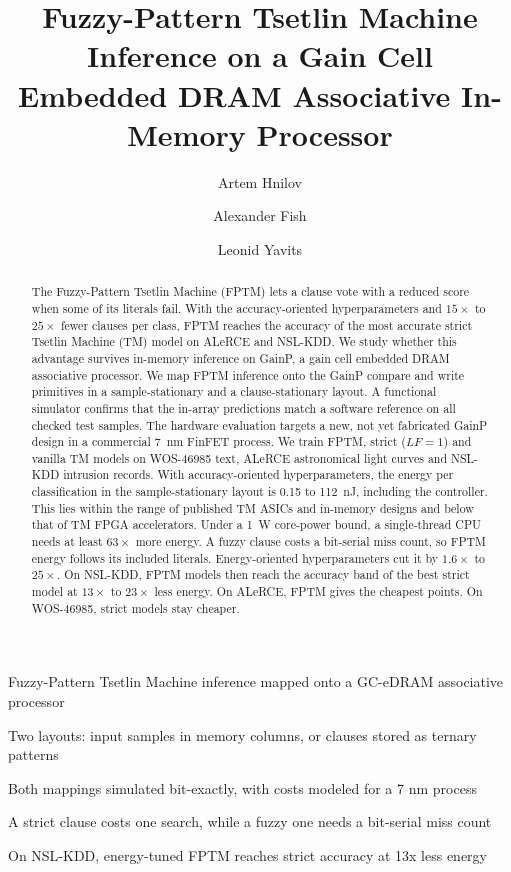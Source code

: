 \documentclass[preprint,review,12pt]{elsarticle}
\newcommand{\gainp}{GainP}
\newcommand{\hyp}[1]{#1}   %
\newcommand{\LF}{\mathit{LF}}
\newcommand{\wosnew}[1]{#1}   %
\newcommand{\artem}[1]{#1}
\begin{document}
\begin{frontmatter}

\title{Fuzzy-Pattern Tsetlin Machine Inference on a Gain Cell Embedded DRAM Associative In-Memory Processor}

\author[ind]{Artem Hnilov}
\author[biu]{Alexander Fish}
\author[biu]{Leonid Yavits}

\begin{abstract}
The Fuzzy-Pattern Tsetlin Machine (FPTM) lets a clause vote with a reduced score when some of its literals fail. \artem{With the accuracy-oriented hyperparameters and $15\times$ to $25\times$ fewer clauses per class, FPTM reaches the accuracy of the most accurate strict Tsetlin Machine (TM) model on ALeRCE and NSL-KDD.}
We study whether this advantage survives in-memory inference on \gainp{}, a gain cell embedded DRAM associative processor.
We map FPTM inference onto the \gainp{} compare and write primitives in a sample-stationary and a clause-stationary layout.
A functional simulator confirms that the in-array predictions match a software reference \wosnew{on all checked test samples}.
The hardware evaluation targets a new, not yet fabricated \gainp{} design in a commercial 7~nm FinFET process.
We train FPTM, strict ($\LF=1$) and vanilla TM models on WOS-46985 text, ALeRCE astronomical light curves and NSL-KDD intrusion records.
\wosnew{With accuracy-oriented hyperparameters,} \hyp{the energy per classification in the sample-stationary layout is 0.15 to 112~nJ, including the controller. This lies within the range of published TM ASICs and in-memory designs and below that of TM FPGA accelerators. Under a 1~W core-power bound, a single-thread CPU needs at least $63\times$ more energy.}
\wosnew{A fuzzy clause costs a bit-serial miss count, so FPTM energy follows its included literals. Energy-oriented hyperparameters cut it by $1.6\times$ to $25\times$. On NSL-KDD, FPTM models then reach the accuracy band of the best strict model at $13\times$ to $23\times$ less energy. On ALeRCE, FPTM gives the cheapest points. On WOS-46985, strict models stay cheaper.}
\end{abstract}

\begin{highlights}
\item Fuzzy-Pattern Tsetlin Machine inference mapped onto a GC-eDRAM associative processor
\item Two layouts: input samples in memory columns, or clauses stored as ternary patterns
\item Both mappings simulated bit-exactly, with costs modeled for a 7 nm process
\item A strict clause costs one search, while a fuzzy one needs a bit-serial miss count
\item \wosnew{On NSL-KDD, energy-tuned FPTM reaches strict accuracy at 13x less energy}
\end{highlights}


\end{frontmatter}
\end{document}
